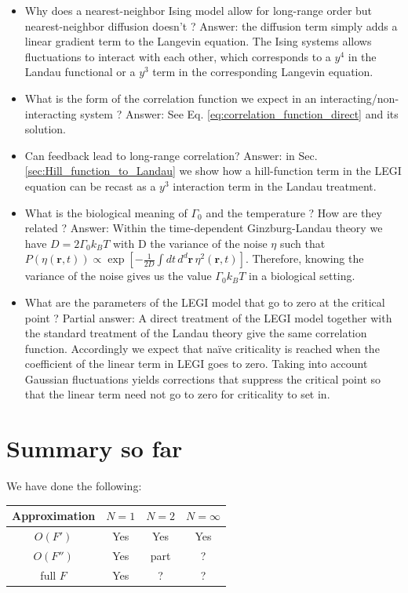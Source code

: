 \documentclass[onecolumn,fleqn,12pt,openany]{book}
\begin{document}
\begin{itemize}
\item Why does a nearest-neighbor Ising model allow for long-range order but nearest-neighbor diffusion doesn't ? Answer: the diffusion term simply adds a linear gradient term to the Langevin equation. The Ising systems allows fluctuations to interact with each other, which corresponds to a $y^4$ in the Landau functional or a  $y^3$ term in the corresponding Langevin equation.
\item What is the form of the correlation function we expect in an interacting/non-interacting system ? Answer: See Eq. \ref{eq:correlation_function_direct} and its solution.
\item Can feedback lead to long-range correlation? Answer: in Sec. \ref{sec:Hill_function_to_Landau} we show how a hill-function term in the LEGI equation can be recast as a $y^3$ interaction term in the Landau treatment.
\item What is the biological meaning of $\Gamma_0$ and the temperature ? How are they related ? Answer: Within the time-dependent Ginzburg-Landau theory we have $D=2\Gamma_0 k_B T$ with D the variance of the noise $\eta$ such that $P(\eta(\mathbf{r},t)) \propto \exp\left[-\frac{1}{2D}\int dt\,d^d\mathbf{r}\, \eta^2(\mathbf{r},t)\right]$. Therefore, knowing the variance of the noise gives us the value $\Gamma_0 k_B T$ in a biological setting.
\item What are the parameters of the LEGI model that go to zero at the critical point ? Partial answer: A direct treatment of the LEGI model together with the standard treatment of the Landau theory give the same correlation function. Accordingly we expect that na\"ive criticality is reached when the coefficient of the linear term in LEGI goes to zero. Taking into account Gaussian fluctuations yields corrections that suppress the critical point so that the linear term need not go to zero for criticality to set in.
\end{itemize}


\section{Summary so far}
We have done the following:

\vspace{0.5cm}

\begin{tabular}{|c|ccc|}
\hline
Approximation & $N=1$ & $N=2$ & $N=\infty$ \\
\hline
$O(F')$ 		& Yes 	& Yes 	& Yes 	\\
$O(F'')$		& Yes 	& part 	& ? 		\\
full $F$		& Yes 	& ? 		& ? 		\\
\hline
\end{tabular}
\end{document}
